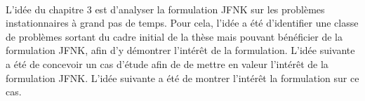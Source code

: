     \paragraph{}
    L'idée du chapitre 3 est d'analyser la formulation JFNK sur les problèmes instationnaires à grand pas de temps.
    Pour cela, l'idée a été d'identifier une classe de problèmes sortant du cadre initial de la thèse mais pouvant bénéficier de la formulation JFNK, afin d'y démontrer l'intérêt de la formulation.
    L'idée suivante a été de concevoir un cas d'étude afin de de mettre en valeur l'intérêt de la formulation JFNK.
    L'idée suivante a été de montrer l’intérêt la formulation sur ce cas.
